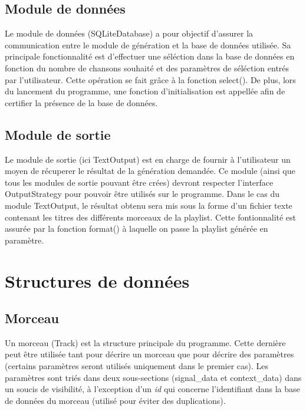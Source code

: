 \subsection{Module de données}
\label{archi:modules:donnees}

Le module de données (SQLiteDatabase) a pour objectif d'assurer la communication entre le module de génération et la base de données utilisée. Sa principale fonctionnalité est d'effectuer une séléction dans la base de données en fonction du nombre de chansons souhaité et des paramètres de séléction entrés par l'utilisateur. Cette opération se fait grâce à la fonction select(). De plus, lors du lancement du programme, une fonction d'initialisation est appellée afin de certifier la présence de la base de données.

\subsection{Module de sortie}
\label{archi:modules:sortie}

Le module de sortie (ici TextOutput) est en charge de fournir à 
l'utilisateur un moyen de récuperer le résultat de la génération demandée. 
Ce module (ainsi que tous les modules de sortie pouvant être crées) devront 
respecter l'interface OutputStrategy pour pouvoir être utilisés sur le 
programme. Dans le cas du module TextOutput, le résultat obtenu sera mis 
sous la forme d'un fichier texte contenant les titres des différents 
morceaux de la playlist. Cette fontionnalité est assurée par la fonction 
format() à laquelle on passe la playlist générée en paramètre.

\section{Structures de données}
\label{archi:structures}

\subsection{Morceau}
\label{archi:structures:morceau}

Un morceau (Track) est la structure principale du programme. Cette dernière 
peut être utilisée tant pour décrire un morceau que pour décrire des 
paramètres (certains paramètres seront utilisés uniquement dans le premier 
cas). Les paramètres sont triés dans deux sous-sections (signal\_data et 
context\_data) dans un soucis de visibilité, à l'exception d'un \textit{id} 
qui concerne l'identifiant dans la base de données du morceau (utilisé pour 
éviter des duplications).

